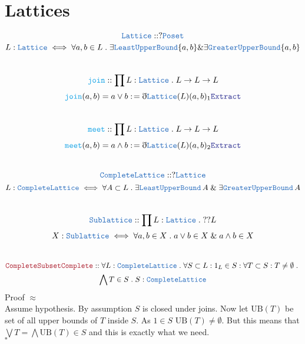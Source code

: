 \documentclass[12pt]{article}
\newcommand{\TYPE}[1]{\textcolor{NavyBlue}{\mathtt{#1}}}
\newcommand{\FUNC}[1]{\textcolor{Cerulean}{\mathtt{#1}}}
\newcommand{\LOGIC}[1]{\textcolor{Blue}{\mathtt{#1}}}
\newcommand{\THM}[1]{\textcolor{Maroon}{\mathtt{#1}}}
\renewcommand{\.}{\; . \;}
\newcommand{\de}{: \kern 0.1pc =}
\renewcommand{\And}{\; \& \;}
\newcommand{\ByDef}{\eth}
\begin{document}
\section{Lattices}
$$\TYPE{Lattice} :: ?\TYPE{Poset} $$
$$ L : \TYPE{Lattice} \iff \forall  a,b \in L \. \exists \TYPE{LeastUpperBound}\{a,b\} \&
 \exists \TYPE{GreaterUpperBound}\{a,b\}    $$
 \\ 
 $$\FUNC{join} :: \prod L : \TYPE{Lattice} \. L \to L \to L $$
 $$\FUNC{join}(a,b) = a\vee b \de \ByDef\TYPE{Lattice}(L)(a,b)_1 \LOGIC{Extract}$$
 \\
 $$\FUNC{meet} :: \prod L : \TYPE{Lattice} \. L \to L \to L $$
 $$\FUNC{meet}(a,b) = a\wedge b \de \ByDef\TYPE{Lattice}(L)(a,b)_2 \LOGIC{Extract}$$
 \\
 $$
 \TYPE{CompleteLattice} :: ?\TYPE{Lattice}
 $$
 $$
  L : \TYPE{CompleteLattice} \iff  \forall A \subset L \. \exists \TYPE{LeastUpperBound}\, A \; \& \;
 \exists \TYPE{GreaterUpperBound} \, A
 $$
 \\
 $$
 \TYPE{Sublattice} :: \prod L : \TYPE{Lattice} \. ??L
 $$
 $$
   X : \TYPE{Sublattice} \iff \forall a,b \in X \. a \vee b \in X \And a \wedge b \in X   
 $$
 \\
 \begin{multline*}
  \THM{CompleteSubsetComplete} :: \forall L : \TYPE{CompleteLattice} \. \forall S \subset   L  : 1_L \in S : \forall T  \subset S : T \neq \emptyset 
  \. \\ \bigwedge T \in S \. S : \TYPE{CompleteLattice}
 \end{multline*}
 Proof $\approx$ \\
 Assume hypothesis.
 By assumption $S$ is closed under joins.
 Now let $\mathrm{UB}(T)$ be set of all upper bounds of $T$ inside $S$. As $1 \in S$  $\mathrm{UB}(T) \neq \emptyset $. But this means that $\bigvee T = \bigwedge \mathrm{UB}(T) \in S$ and this is exactly what we need. \\
 $\square$ 
\end{document}
